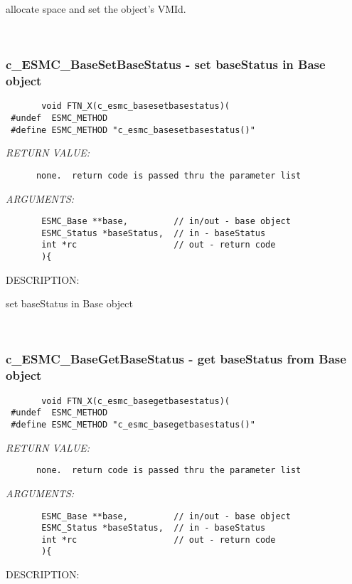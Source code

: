        allocate space and set the object's VMId.
   
 
\mbox{}\hrulefill\
 
\subsubsection [c\_ESMC\_BaseSetBaseStatus] {c\_ESMC\_BaseSetBaseStatus - set baseStatus in Base object}


  
\begin{verbatim}       void FTN_X(c_esmc_basesetbasestatus)(
 #undef  ESMC_METHOD
 #define ESMC_METHOD "c_esmc_basesetbasestatus()"\end{verbatim}{\em RETURN VALUE:}
\begin{verbatim}      none.  return code is passed thru the parameter list
   \end{verbatim}{\em ARGUMENTS:}
\begin{verbatim}       ESMC_Base **base,         // in/out - base object
       ESMC_Status *baseStatus,  // in - baseStatus
       int *rc                   // out - return code
       ){
   \end{verbatim}
{\sf DESCRIPTION:\\ }


       set baseStatus in Base object
   
 
\mbox{}\hrulefill\
 
\subsubsection [c\_ESMC\_BaseGetBaseStatus] {c\_ESMC\_BaseGetBaseStatus - get baseStatus from Base object}


  
\begin{verbatim}       void FTN_X(c_esmc_basegetbasestatus)(
 #undef  ESMC_METHOD
 #define ESMC_METHOD "c_esmc_basegetbasestatus()"\end{verbatim}{\em RETURN VALUE:}
\begin{verbatim}      none.  return code is passed thru the parameter list
   \end{verbatim}{\em ARGUMENTS:}
\begin{verbatim}       ESMC_Base **base,         // in/out - base object
       ESMC_Status *baseStatus,  // in - baseStatus
       int *rc                   // out - return code
       ){
   \end{verbatim}
{\sf DESCRIPTION:\\ }



